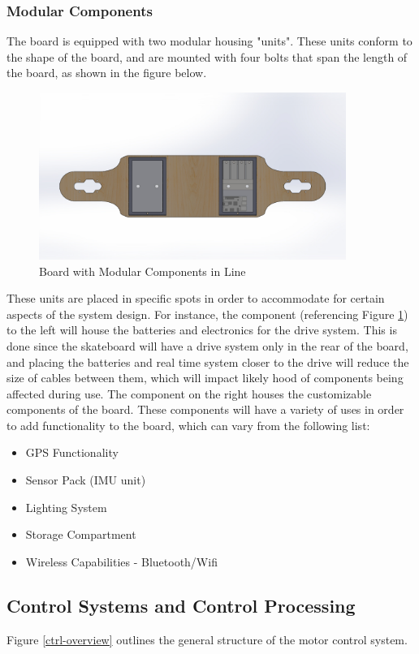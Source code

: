\documentclass[titlepage, letterpaper,12pt]{article}
\begin{document}
\subsubsection{Modular Components}
The board is equipped with two modular housing "units". These units conform to the shape of the board, and are mounted with four bolts that span the length of the board, as shown in the figure below.

\begin{figure}
    \centering
    \includegraphics[width=10cm]{figs/ModularAssembledBottom.JPG}
    \caption{Board with Modular Components in Line}
    \label{inline}
\end{figure}

These units are placed in specific spots in order to accommodate for certain aspects of the system design. For instance, the component (referencing Figure \ref{inline}) to the left will house the batteries and electronics for the drive system. This is done since the skateboard will have a drive system only in the rear of the board, and placing the batteries and real time system closer to the drive will reduce the size of cables between them, which will impact likely hood of components being affected during use. The component on the right houses the customizable components of the board. These components will have a variety of uses in order to add functionality to the board, which can vary from the following list:

\begin{itemize}
    \item GPS Functionality
    \item Sensor Pack (IMU unit)
    \item Lighting System
    \item Storage Compartment
    \item Wireless Capabilities - Bluetooth/Wifi
\end{itemize}

\subsection{Control Systems and Control Processing}
Figure \ref{ctrl-overview} outlines the general structure of the motor control system.
\end{document}
